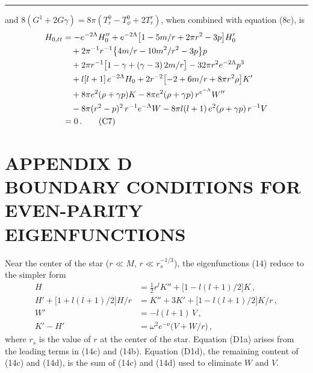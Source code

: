 \documentclass[12pt]{article}
\begin{document}
\bigskip
\noindent\rule{0.4\textwidth}{0.4pt}



and $8(G^1 + 2G\gamma) = 8\pi(T_r^0 - T_\phi^0 + 2T_r^r)$, when combined with equation (8c), is
%
\begin{align}
H_{0,tt}
  &= -e^{-2\Lambda} H_0''
     + e^{-2\Lambda} \bigl[1 - 5m/r + 2\pi r^2 - 3p\bigr] H_0'   %
\notag \\
  &\quad
     + 2\pi^{-1} r^{-1} \bigl\{4m/r - 10m^2/r^2 - 3p\bigr\} p    %
\notag \\
  &\quad
     + 2\pi r^{-1} \bigl[1 - \gamma + (\gamma - 3)\,2m/r\bigr]
     - 32\pi r^2 e^{-2\Lambda} p^3                                  %
\notag \\
  &\quad
     + l[l+1]\,e^{-2\Lambda} H_0
     + 2r^{-2} \bigl[-2 + 6m/r + 8\pi r^2 \rho\bigr] K'
\notag \\
  &\quad
     + 8\pi e^2 (\rho + \gamma p) K
     - 8\pi e^2 (\rho + \gamma p)\,r^{e^{-\Lambda}} W''             %
\notag \\
  &\quad
     - 8\pi (r^2 - p)^2\,r^{-1} e^{-\Lambda} W
     - 8\pi l(l+1)\,e^2 (\rho + \gamma p)\,r^{-1} V                %
\notag \\
  &= 0 \,.
\tag{C7}
\end{align}


\section*{APPENDIX D \\ BOUNDARY CONDITIONS FOR EVEN-PARITY EIGENFUNCTIONS}

Near the center of the star ($r \ll M$, $r \ll r_s^{-1/3}$), the eigenfunctions (14) reduce to the simpler
form
%
\begin{align}
H    &= \tfrac{1}{2} r^l K'' + \bigl[1 - l(l+1)/2\bigr] K \,, \tag{D1a} \\[4pt]
H' + \bigl[1 + l(l+1)/2\bigr] H/r
     &= K'' + 3K' + \bigl[1 - l(l+1)/2\bigr] K/r \,, \tag{D1b} \\[4pt]
W'   &= -l(l+1)\,V \,, \tag{D1c} \\[4pt]
K' - H' &= \omega^2 e^{-\nu} \bigl(V + W/r\bigr) \,, \tag{D1d}
\end{align}
%
where $r_s$ is the value of $r$ at the center of the star. Equation (D1a) arises from the leading terms
in (14c) and (14b). Equation (D1d), the remaining content of (14c) and (14d), is the sum of
(14c) and (14d) used to eliminate $W$ and $V$.
\end{document}
